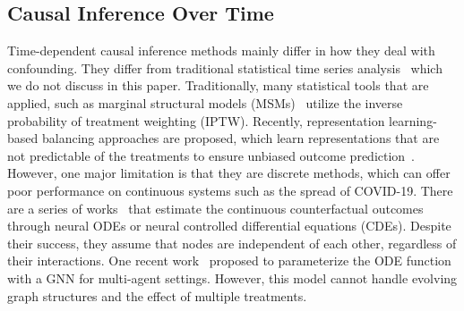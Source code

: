 \subsection{Causal Inference Over Time}
Time-dependent causal inference methods mainly differ in how they deal with confounding. They differ from traditional statistical time series analysis~\cite{kipf2018neural,zhang2023crossformer,bai2022temporal} which we do not discuss in this paper.  Traditionally, many statistical tools that are applied, such as marginal structural models (MSMs)~\cite{robins2000marginal} utilize the inverse probability of treatment weighting (IPTW). Recently,  representation learning-based balancing approaches are proposed, which learn representations that are not predictable of the treatments to ensure unbiased outcome prediction~\cite{BicaAJS20,MelnychukFF22}. 
However, one major limitation is that they are discrete methods, which can offer poor performance on continuous systems such as the spread of COVID-19. 
There are a series of works~\cite{seedat2022continuous,bica2020crn,gwak2020neural,de2022predicting} that estimate the continuous counterfactual outcomes through neural ODEs or neural controlled differential equations (CDEs). Despite their success, they assume that nodes are independent of each other, regardless of their interactions. One recent work~\cite{anonymous2023cfgode} proposed to parameterize the ODE function with a GNN for multi-agent settings. However, this model cannot handle evolving graph structures and the effect of multiple treatments.










